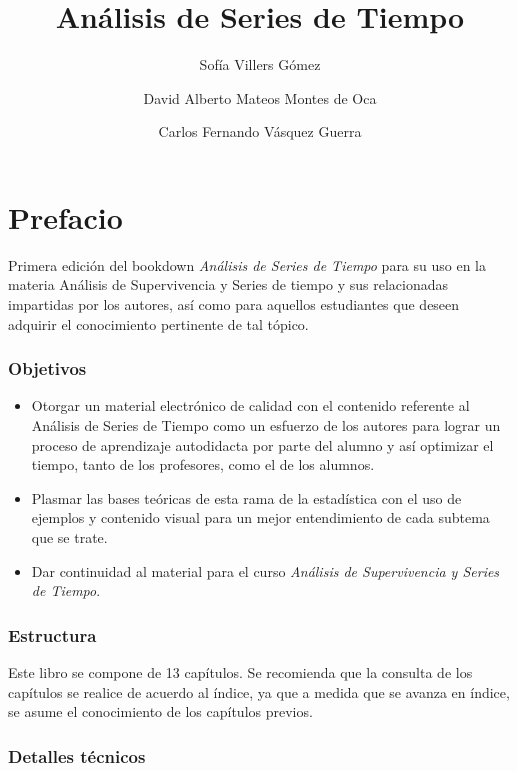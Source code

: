 \documentclass[
  a4paper,
  oneside,
  openany]{book}
\title{Análisis de Series de Tiempo}
\author{Sofía Villers Gómez \and David Alberto Mateos Montes de Oca \and Carlos Fernando Vásquez Guerra}
\date{}
\begin{document}
\maketitle

{
\setcounter{tocdepth}{3}
\tableofcontents
}
\hypertarget{prefacio}{%
\chapter*{Prefacio}\label{prefacio}}


Primera edición del bookdown \emph{Análisis de Series de Tiempo} para su uso en la materia Análisis de Supervivencia y Series de tiempo y sus relacionadas impartidas por los autores, así como para aquellos estudiantes que deseen adquirir el conocimiento pertinente de tal tópico.

\hypertarget{objetivos}{%
\subsection*{Objetivos}\label{objetivos}}


\begin{itemize}
\item
  Otorgar un material electrónico de calidad con el contenido referente al Análisis de Series de Tiempo como un esfuerzo de los autores para lograr un proceso de aprendizaje autodidacta por parte del alumno y así optimizar el tiempo, tanto de los profesores, como el de los alumnos.
\item
  Plasmar las bases teóricas de esta rama de la estadística con el uso de ejemplos y contenido visual para un mejor entendimiento de cada subtema que se trate.
\item
  Dar continuidad al material para el curso \emph{Análisis de Supervivencia y Series de Tiempo}.
\end{itemize}

\hypertarget{estructura}{%
\subsection*{Estructura}\label{estructura}}


Este libro se compone de 13 capítulos. Se recomienda que la consulta de los capítulos se realice de acuerdo al índice, ya que a medida que se avanza en índice, se asume el conocimiento de los capítulos previos.

\hypertarget{detalles-tuxe9cnicos}{%
\subsection*{Detalles técnicos}\label{detalles-tuxe9cnicos}}
\end{document}

